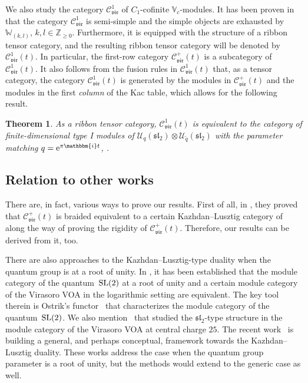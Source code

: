 \documentclass[10pt,a4paper]{amsart}
\numberwithin{equation}{section}
\newtheorem{thm}{Theorem}[section]
\newcommand{\what}[1]{\widehat{#1}}
\newcommand{\bZ}{\mathbb{Z}}
\newcommand{\cC}{\mathcal{C}}
\newcommand{\cU}{\mathcal{U}}
\newcommand{\fsl}{\mathfrak{sl}}
\newcommand{\bbmi}{\mathbbm{i}}
\newcommand{\UEA}{\cU}
\newcommand{\Uq}{\UEA_{q}}
\newcommand{\catVir}{\cC_{\vir}}
\newcommand{\virvoa}{\mathbb{V}}
\newcommand{\virmod}{\mathbb{W}}
\newcommand{\vir}{\mathfrak{vir}}
\begin{document}
We also study the category $\catVir^{1}$ of $C_{1}$-cofinite $\virvoa_{c}$-modules.
It has been proven in~\cite{CJORY-tensor_categories_arising_from_Virasoro_algebra} that the category $\catVir^{1}$ is semi-simple and the simple objects are exhausted by $\virmod_{(k,l)}$, $k,l \in\bZ_{\geq 0}$.
Furthermore, it is equipped with the structure of a ribbon tensor category,
and the resulting ribbon tensor category will be denoted by $\catVir^{1}(t)$.
In particular, the first-row category $\catVir^{+}(t)$ is a subcategory of $\catVir^{1}(t)$.
It also follows from the fusion rules in $\catVir^{1}(t)$ that, as a tensor category,
the category $\catVir^{1}(t)$ is generated by the modules in $\catVir^{+}(t)$ and the modules in the first {\it column} of the Kac table,
which allows for the following result.


\begin{thm}
\label{thm:C1-cat_QG}
As a ribbon tensor category, $\catVir^{1}(t)$ is equivalent to the category of finite-dimensional type I modules of $\Uq (\fsl_{2})\otimes \cU_{\tilde{q}}(\fsl_{2})$ with the parameter matching $q = {\rm e}^{\pi\bbmi t}$, \smash{$\tilde{q} = {\rm e}^{\pi \bbmi t^{-1}}$}.
\end{thm}


\subsection{Relation to other works}
There are, in fact, various ways to prove our results.
First of all, in \cite{CJORY-tensor_categories_arising_from_Virasoro_algebra},
they proved that $\catVir^{+}(t)$ is braided equivalent to a certain Kazhdan--Lusztig category of \smash{$\what{\fsl}_{2}$} along the way of proving the rigidity of $\catVir^{+}(t)$.
Therefore, our results can be derived from it, too.


There are also approaches to the Kazhdan--Lusztig-type duality when the quantum group is at a root of unity.
In \cite{GannonNegron-quantum_sltwo_and_log_VOAs}, it has been established that the module category of the quantum~${\rm SL}(2)$ at a root of unity and a certain module category of the Virasoro VOA in the logarithmic setting are equivalent.
The key tool therein is Ostrik's functor~\cite{ostrik2005module} that characterizes the module category of the quantum~${\rm SL}(2)$.
We also mention~\cite{McRaeYang2022} that studied the $\fsl_{2}$-type structure in the module category of the Virasoro VOA at central charge $25$.
The recent work~\cite{creutzig2023algebraic,lentner2025conditional} is building a general, and perhaps conceptual, framework towards the Kazhdan--Lusztig duality.
These works address the case when the quantum group parameter is a root of unity, but the methods would extend to the generic case as well.
\end{document}

